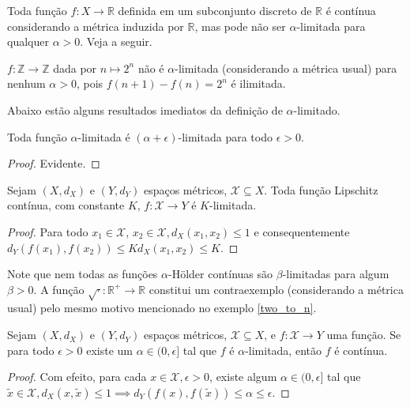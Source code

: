 Toda função $f : X \to \mathbb{R}$ definida em um subconjunto discreto de $\mathbb{R}$ é contínua considerando a métrica induzida por $\mathbb{R}$, mas pode não ser $\alpha$-limitada para qualquer $\alpha > 0$. Veja a seguir.

\begin{example} \label{two_to_n}
  $f : \mathbb{Z} \to \mathbb{Z}$ dada por $n \mapsto 2^n$ não é $\alpha$-limitada (considerando a métrica usual) para nenhum $\alpha > 0$, pois $f(n + 1) - f(n) = 2^{n}$ é ilimitada.
\end{example}

Abaixo estão alguns resultados imediatos da definição de $\alpha$-limitado.

\begin{theorem}
  Toda função $\alpha$-limitada é $(\alpha+\epsilon)$-limitada para todo $\epsilon > 0$.
\end{theorem}
\begin{proof}
  Evidente.
\end{proof}

\begin{theorem}
  Sejam $(X, d_X)$ e $(Y, d_Y)$ espaços métricos, $\mathcal{X} \subseteq X$. Toda função Lipschitz contínua, com constante $K$, $f : \mathcal{X} \to Y$ é $K$-limitada.
\end{theorem}
\begin{proof}
  Para todo $x_1 \in \mathcal{X}$, $x_2 \in \mathcal{X}, d_X(x_1, x_2) \le 1$ e consequentemente $d_Y(f(x_1), f(x_2)) \le K d_X(x_1, x_2) \le K$.
\end{proof}
Note que nem todas as funções $\alpha$-Hölder contínuas são $\beta$-limitadas para algum $\beta > 0$. A função $\sqrt{\cdot} : \mathbb{R}^+ \to \mathbb{R}$ constitui um contraexemplo (considerando a métrica usual) pelo mesmo motivo mencionado no exemplo \ref{two_to_n}.

\begin{theorem}
  Sejam $(X, d_X)$ e $(Y, d_Y)$ espaços métricos, $\mathcal{X} \subseteq X$, e $f : \mathcal{X} \to Y$ uma função. Se para todo $\epsilon > 0$ existe um $\alpha \in (0, \epsilon]$ tal que $f$ é $\alpha$-limitada, então $f$ é contínua.
\end{theorem}
\begin{proof}
  Com efeito, para cada $x \in \mathcal{X}, \epsilon > 0$, existe algum $\alpha \in (0, \epsilon]$ tal que $\tilde{x} \in \mathcal{X}, d_X(x, \tilde{x}) \le 1 \implies d_Y(f(x), f(\tilde{x})) \le \alpha \le \epsilon$.
\end{proof}

